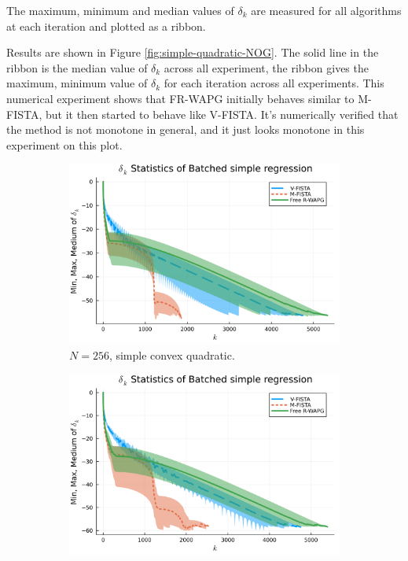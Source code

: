 \documentclass[12pt]{article}
\begin{document}
            The maximum, minimum and median values of $\delta_k$ are measured for all algorithms at each iteration and plotted as a ribbon.
            \par
            Results are shown in Figure \ref{fig:simple-quadratic-NOG}.
            The solid line in the ribbon is the median value of $\delta_k$ across all experiment, the ribbon gives the maximum, minimum value of $\delta_k$ for each iteration across all experiments.
            This numerical experiment shows that FR-WAPG initially behaves similar to M-FISTA, but it then started to behave like V-FISTA.
            It's numerically verified that the method is not monotone in general, and it just looks monotone in this experiment on this plot.
            \begin{figure}[H]
                \begin{subfigure}[b]{0.47\textwidth}
                    \centering
                    \includegraphics[width=\textwidth]{assets/simple_regression_batched-256.png}
                    \caption{$N = 256$, simple convex quadratic.}
                \end{subfigure}
                \hfill
                \begin{subfigure}[b]{0.47\textwidth}
                    \centering
                    \includegraphics[width=\textwidth]{assets/simple_regression_batched-1024.png}

\end{subfigure}
\end{figure}
\end{document}
